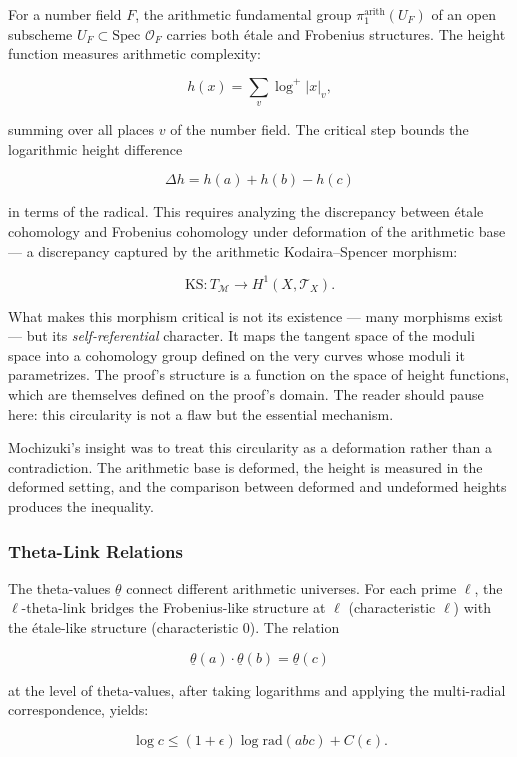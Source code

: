 \documentclass[12pt,a4paper]{article}
\begin{document}
For a number field $F$, the arithmetic fundamental group $\pi_1^{\text{arith}}(U_F)$ of an open subscheme $U_F \subset \text{Spec } \mathcal{O}_F$ carries both étale and Frobenius structures. The height function measures arithmetic complexity:

\[h(x) = \sum_{v} \log^+ |x|_v,\]

summing over all places $v$ of the number field. The critical step bounds the logarithmic height difference

\[\Delta h = h(a) + h(b) - h(c)\]

in terms of the radical. This requires analyzing the discrepancy between étale cohomology and Frobenius cohomology under deformation of the arithmetic base --- a discrepancy captured by the arithmetic Kodaira--Spencer morphism:

\[\text{KS}: T_{\mathcal{M}} \to H^1(X, \mathcal{T}_X).\]

What makes this morphism critical is not its existence --- many morphisms exist --- but its \emph{self-referential} character. It maps the tangent space of the moduli space into a cohomology group defined on the very curves whose moduli it parametrizes. The proof's structure is a function on the space of height functions, which are themselves defined on the proof's domain. The reader should pause here: this circularity is not a flaw but the essential mechanism.

Mochizuki's insight was to treat this circularity as a deformation rather than a contradiction. The arithmetic base is deformed, the height is measured in the deformed setting, and the comparison between deformed and undeformed heights produces the inequality.

\subsubsection{Theta-Link Relations}

The theta-values $\underline{\theta}$ connect different arithmetic universes. For each prime $\ell$, the $\ell$-theta-link bridges the Frobenius-like structure at $\ell$ (characteristic $\ell$) with the étale-like structure (characteristic $0$). The relation

\[\underline{\theta}(a) \cdot \underline{\theta}(b) = \underline{\theta}(c)\]

at the level of theta-values, after taking logarithms and applying the multi-radial correspondence, yields:

\[\log c \leq (1 + \epsilon) \log \text{rad}(abc) + C(\epsilon).\]
\end{document}
